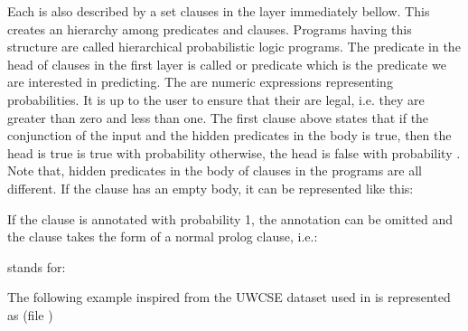 \documentclass[letterpaper,10pt,english]{sphinxmanual}
\begin{document}
Each  is also described by a set clauses in the layer immediately bellow. This creates an hierarchy among predicates and clauses. Programs having this structure are called hierarchical probabilistic logic programs. The predicate in the head of clauses in the first layer is called  or  predicate which is the predicate we are interested in predicting.
The  are numeric expressions representing probabilities.
It is up to the user to ensure that their are legal, i.e. they are greater than zero and less than one. The first clause above states that if the conjunction of the input and the hidden predicates in the body is true, then the head is true is true with probability  otherwise, the head is false with probability .  Note that, hidden predicates in the body of clauses in the programs are all different.
If the clause has an empty body, it can be represented like this:

%
\begin{sphinxVerbatim}[commandchars=\\\{\}]
\end{sphinxVerbatim}

If the clause is annotated with probability 1, the annotation can be omitted and the clause takes
the form of a normal prolog clause, i.e.:

%
\begin{sphinxVerbatim}[commandchars=\\\{\}]
  
\end{sphinxVerbatim}

stands for:

%
\begin{sphinxVerbatim}[commandchars=\\\{\}]
  
\end{sphinxVerbatim}

The following example inspired from the UWCSE dataset used in \label{\detokenize{index:id5}}{\hyperref[\detokenize{index:kok2005learning}]{\sphinxcrossref{{[}KD05{]}}}} is represented as (file )
\end{document}
